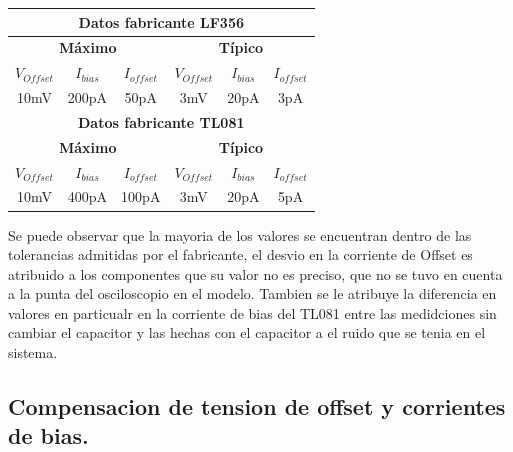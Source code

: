 \begin{table}[H]
\begin{center}
\begin{tabular}{|c|c|c|c|c|c|}
\hline
\multicolumn{6}{|c|}{\textbf{Datos fabricante LF356}}                                                                                     \\ \hline
\multicolumn{3}{|c|}{\textbf{Máximo}}                               & \multicolumn{3}{c|}{\textbf{Típico}}                                \\ \hline
\textbf{$V_{Offset}$} & \textbf{$I_{bias}$} & \textbf{$I_{offset}$} & \textbf{$V_{Offset}$} & \textbf{$I_{bias}$} & \textbf{$I_{offset}$} \\ \hline
10mV                  & 200pA               & 50pA                  & 3mV                   & 20pA                & 3pA                   \\ \hline
\multicolumn{6}{|c|}{\textbf{Datos fabricante TL081}}                                                                                     \\ \hline
\multicolumn{3}{|c|}{\textbf{Máximo}}                               & \multicolumn{3}{c|}{\textbf{Típico}}                                \\ \hline
\textbf{$V_{Offset}$} & \textbf{$I_{bias}$} & \textbf{$I_{offset}$} & \textbf{$V_{Offset}$} & \textbf{$I_{bias}$} & \textbf{$I_{offset}$} \\ \hline
10mV                  & 400pA               & 100pA                 & 3mV                   & 20pA                & 5pA                   \\ \hline
\end{tabular}
\end{center}
\end{table}
Se puede observar que la mayoria de los valores se encuentran dentro de las tolerancias admitidas por el fabricante, el desvio en la corriente de Offset es atribuido a los componentes que su valor no es preciso, que no se tuvo en cuenta a la punta del osciloscopio en el modelo.
Tambien se le atribuye la diferencia en valores en particualr en la corriente  de bias del TL081 entre las medidciones sin cambiar el capacitor y las hechas con el capacitor a el ruido que se tenia en el sistema.
\subsection{Compensacion de tension de offset y corrientes de bias.}
